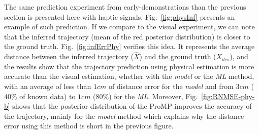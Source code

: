 \documentclass[runningheads,a4paper]{llncs}
\begin{document}
The same prediction experiment from early-demonstrations than the previous section is presented here with haptic signals. Fig.~\ref{fig:physInf} presents an example of such prediction. If we compare to the visual experiment, we can note that the inferred trajectory (mean of the red posterior distribution) is closer to the ground truth. 
Fig.~\ref{fig:infErrPhy} verifies this idea. It represents the average distance between the inferred trajectory ($\hat{X}$) and the ground truth ($X_{des}$), and the results show that the trajectory prediction using physical estimation is more accurate than the visual estimation, whether with the \textit{model} or the \textit{ML} method, with an average of less than $1cm$ of distance error for the \textit{model} and from $3cm$ ($40\%$ of known data) to $1cm$ ($80\%$) for the \textit{ML}. Moreover, Fig.~\ref{fig:RNMSE-phy-b} shows that the posterior distribution of the ProMP improves the accuracy of the trajectory, mainly for the \textit{model} method which explains why the distance error using this method is short in the previous figure. 
\end{document}
